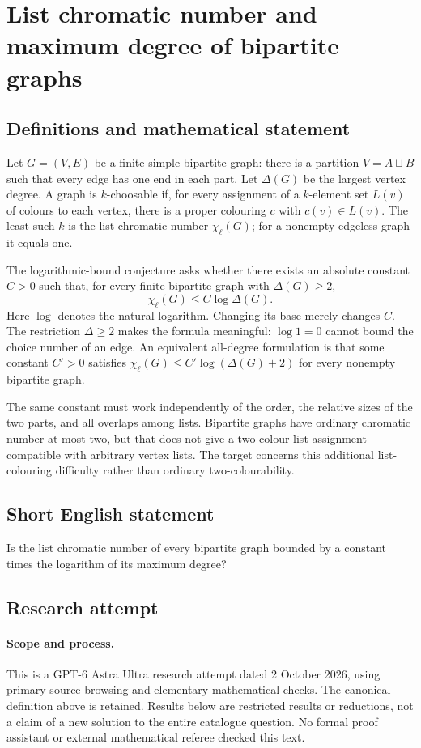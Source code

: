 \documentclass[11pt,a4paper]{article}
\begin{document}
\section*{List chromatic number and maximum degree of bipartite graphs}\label{statement}

\subsection{Definitions and mathematical statement}
Let $G=(V,E)$ be a finite simple bipartite graph: there is a partition
$V=A\sqcup B$ such that every edge has one end in each part. Let
$\Delta(G)$ be the largest vertex degree. A graph is $k$-choosable if, for
every assignment of a $k$-element set $L(v)$ of colours to each vertex,
there is a proper colouring $c$ with $c(v)\in L(v)$. The least such $k$
is the list chromatic number $\chi_\ell(G)$; for a nonempty edgeless graph
it equals one.

The logarithmic-bound conjecture asks whether there exists an absolute
constant $C>0$ such that, for every finite bipartite graph with
$\Delta(G)\ge2$,
\[
                      \chi_\ell(G)\le C\log\Delta(G).
\]
Here $\log$ denotes the natural logarithm. Changing its base merely
changes $C$. The restriction $\Delta\ge2$ makes the formula meaningful:
$\log1=0$ cannot bound the choice number of an edge. An equivalent
all-degree formulation is that some constant $C'>0$ satisfies
$\chi_\ell(G)\le C'\log(\Delta(G)+2)$ for every nonempty bipartite graph.

The same constant must work independently of the order, the relative
sizes of the two parts, and all overlaps among lists. Bipartite graphs
have ordinary chromatic number at most two, but that does not give a
two-colour list assignment compatible with arbitrary vertex lists.
The target concerns this additional list-colouring difficulty rather
than ordinary two-colourability.
\subsection{Short English statement}
Is the list chromatic number of every bipartite graph bounded by a constant times the logarithm of its maximum degree?
\subsection{Research attempt}
\paragraph{Scope and process.}
This is a GPT-6 Astra Ultra research attempt dated 2 October 2026, using
primary-source browsing and elementary mathematical checks. The canonical
definition above is retained. Results below are restricted results or
reductions, not a claim of a new solution to the entire catalogue question.
No formal proof assistant or external mathematical referee checked this text.
\end{document}
